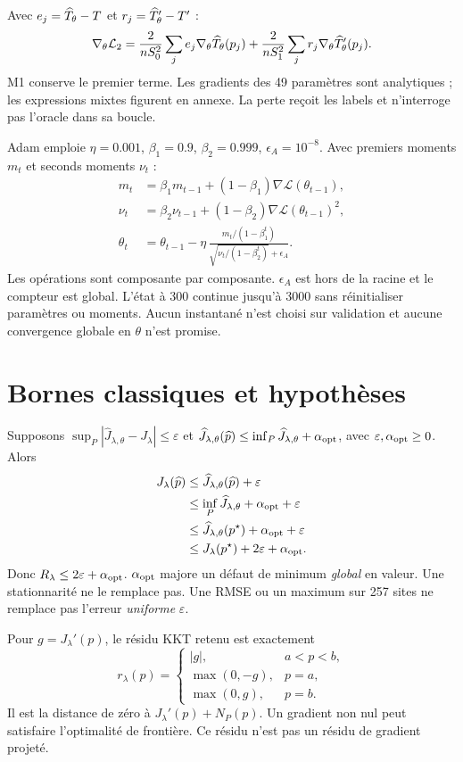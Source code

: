 \documentclass[11pt,a4paper]{article}
\newcommand{\Jhat}{\widehat J_{\lambda,\theta}}
\begin{document}
Avec $e_j=\widehat T_\theta-T$ et $r_j=\widehat T_\theta'-T'$ :
\[
\nabla_\theta\mathcal L_2=
\frac2{nS_0^2}\sum_j e_j\nabla_\theta\widehat T_\theta(p_j)
+\frac2{nS_1^2}\sum_j r_j\nabla_\theta\widehat T_\theta'(p_j).
\]
M1 conserve le premier terme. Les gradients des 49 paramètres sont
analytiques ; les expressions mixtes figurent en annexe.
La perte reçoit les labels et n'interroge pas l'oracle dans sa boucle.

Adam emploie $\eta=0.001$, $\beta_1=0.9$, $\beta_2=0.999$,
$\epsilon_A=10^{-8}$. Avec premiers moments $m_t$ et seconds moments $\nu_t$ :
\begin{align*}
m_t&=\beta_1m_{t-1}+(1-\beta_1)\nabla\mathcal L(\theta_{t-1}),\\
\nu_t&=\beta_2\nu_{t-1}+(1-\beta_2)\nabla\mathcal L(\theta_{t-1})^2,\\
\theta_t&=\theta_{t-1}
-\eta\,\frac{m_t/(1-\beta_1^t)}
{\sqrt{\nu_t/(1-\beta_2^t)}+\epsilon_A}.
\end{align*}
Les opérations sont composante par composante. $\epsilon_A$ est hors de
la racine et le compteur est global. L'état à 300 continue jusqu'à 3000
sans réinitialiser paramètres ou moments. Aucun instantané n'est choisi
sur validation et aucune convergence globale en $\theta$ n'est promise.

\clearpage
\section{Bornes classiques et hypothèses}
\label{sec:bornes}
Supposons $\sup_P|\Jhat-J_\lambda|\leq\varepsilon$ et
$\Jhat(\widehat p)\leq\inf_P\Jhat+\alpha_{\rm opt}$,
avec $\varepsilon,\alpha_{\rm opt}\geq0$. Alors
\begin{align*}
J_\lambda(\widehat p)
&\leq\Jhat(\widehat p)+\varepsilon\\
&\leq\inf_P\Jhat+\alpha_{\rm opt}+\varepsilon\\
&\leq\Jhat(p^\star)+\alpha_{\rm opt}+\varepsilon\\
&\leq J_\lambda(p^\star)+2\varepsilon+\alpha_{\rm opt}.
\end{align*}
Donc $R_\lambda\leq2\varepsilon+\alpha_{\rm opt}$.
$\alpha_{\rm opt}$ majore un défaut de minimum \emph{global} en valeur.
Une stationnarité ne le remplace pas. Une RMSE ou un maximum sur 257
sites ne remplace pas l'erreur \emph{uniforme} $\varepsilon$.

Pour $g=J_\lambda'(p)$, le résidu KKT retenu est exactement
\[
r_\lambda(p)=
\begin{cases}
|g|,&a<p<b,\\
\max(0,-g),&p=a,\\
\max(0,g),&p=b.
\end{cases}
\]
Il est la distance de zéro à $J_\lambda'(p)+N_P(p)$.
Un gradient non nul peut satisfaire l'optimalité de frontière.
Ce résidu n'est pas un résidu de gradient projeté.
\end{document}
